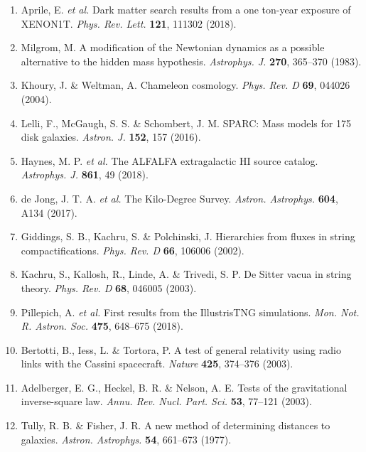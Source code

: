 \documentclass[11pt,a4paper]{article}
\begin{document}
\begin{enumerate}
\item Aprile, E. \textit{et al.} Dark matter search results from a one ton-year exposure of XENON1T. \textit{Phys. Rev. Lett.} \textbf{121}, 111302 (2018).

\item Milgrom, M. A modification of the Newtonian dynamics as a possible alternative to the hidden mass hypothesis. \textit{Astrophys. J.} \textbf{270}, 365--370 (1983).

\item Khoury, J. \& Weltman, A. Chameleon cosmology. \textit{Phys. Rev. D} \textbf{69}, 044026 (2004).

\item Lelli, F., McGaugh, S. S. \& Schombert, J. M. SPARC: Mass models for 175 disk galaxies. \textit{Astron. J.} \textbf{152}, 157 (2016).

\item Haynes, M. P. \textit{et al.} The ALFALFA extragalactic HI source catalog. \textit{Astrophys. J.} \textbf{861}, 49 (2018).

\item de Jong, J. T. A. \textit{et al.} The Kilo-Degree Survey. \textit{Astron. Astrophys.} \textbf{604}, A134 (2017).

\item Giddings, S. B., Kachru, S. \& Polchinski, J. Hierarchies from fluxes in string compactifications. \textit{Phys. Rev. D} \textbf{66}, 106006 (2002).

\item Kachru, S., Kallosh, R., Linde, A. \& Trivedi, S. P. De Sitter vacua in string theory. \textit{Phys. Rev. D} \textbf{68}, 046005 (2003).

\item Pillepich, A. \textit{et al.} First results from the IllustrisTNG simulations. \textit{Mon. Not. R. Astron. Soc.} \textbf{475}, 648--675 (2018).

\item Bertotti, B., Iess, L. \& Tortora, P. A test of general relativity using radio links with the Cassini spacecraft. \textit{Nature} \textbf{425}, 374--376 (2003).

\item Adelberger, E. G., Heckel, B. R. \& Nelson, A. E. Tests of the gravitational inverse-square law. \textit{Annu. Rev. Nucl. Part. Sci.} \textbf{53}, 77--121 (2003).

\item Tully, R. B. \& Fisher, J. R. A new method of determining distances to galaxies. \textit{Astron. Astrophys.} \textbf{54}, 661--673 (1977).


\end{enumerate}
\end{document}

